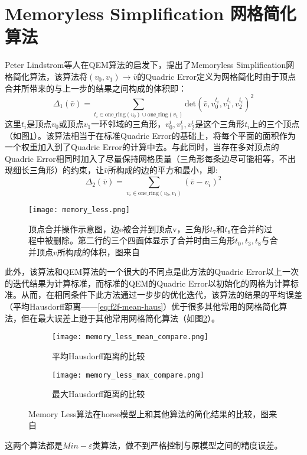 \section{Memoryless Simplification 网格简化算法}
Peter Lindstrom等人在QEM算法的启发下，提出了Memoryless Simplification网格简化算法\cite{memory-less}，该算法将$(v_0,v_1) \to \bar{v}$的Quadric Error定义为网格简化时由于顶点合并所带来的与上一步的结果之间构成的体积即：
\begin{equation}
  \Delta_1(\bar{v}) = \sum_{t_i \in \text{one\_ring}(v_0) \cup \text{one\_ring}(v_1)} \text{det} (\bar{v},v_0^{t_i},v_1^{t_i},v_2^{t_i})^2
\end{equation}
这里$t_i$是顶点$v_0$或顶点$v_1$一环邻域的三角形，$v_0^i,v_1^i, v_2^i$是这个三角形$t_i$上的三个顶点（如图\ref{fig:memory-less}）。该算法相当于在标准Quadric Error的基础上，将每个平面的面积作为一个权重加入到了Quadric Error的计算中去。与此同时，当存在多对顶点的Quadric Error相同时加入了尽量保持网格质量（三角形每条边尽可能相等，不出现细长三角形）的约束，让$\bar{v}$所构成的边的平方和最小，即:
\begin{equation}
  \Delta_2(\bar{v}) = \sum_{v_i \in \text{one\_ring} (v_0,v_1)} (\bar{v}-v_i)^2
\end{equation}
\begin{figure}[htbp]
    \centering
    \texttt{[image: memory\_less.png]}
    \caption{顶点合并操作示意图，边e被合并到顶点v，三角形$t_7$和$t_8$在合并的过程中被删除。第二行的三个四面体显示了合并时由三角形$t_0,t_3,t_8$与合并顶点$v$所构成的体积，图来自\cite{memory-less}}
    \label{fig:memory-less}
\end{figure}
此外，该算法和QEM算法的一个很大的不同点是此方法的Quadric Error以上一次的迭代结果为计算标准，而标准的QEM的Quadric Error以初始化的网格为计算标准。从而，在相同条件下此方法通过一步步的优化迭代，该算法的结果的平均误差（平均Hausdorff距离——\ref{eq:f2f-mean-haus}）优于很多其他常用的网格简化算法，但在最大误差上逊于其他常用网格简化算法（如图\ref{fig:memory-less-compare}）。
\begin{figure}[htbp]
  \centering
  \begin{subfigure}[b]{0.7\textwidth}
    \texttt{[image: memory\_less\_mean\_compare.png]}
    \caption[input]{平均Hausdorff距离的比较}
    \end{subfigure}
    \begin{subfigure}[b]{0.7\textwidth}
      \texttt{[image: memory\_less\_max\_compare.png]}
      \caption[mls]{最大Hausdorff距离的比较}
    \end{subfigure}
    \caption[Result]{Memory Less算法在horse模型上和其他算法的简化结果的比较，图来自\cite{memory-less}}
    \label{fig:memory-less-compare}
\end{figure}
这两个算法都是$Min-\varepsilon$类算法，做不到严格控制与原模型之间的精度误差。

